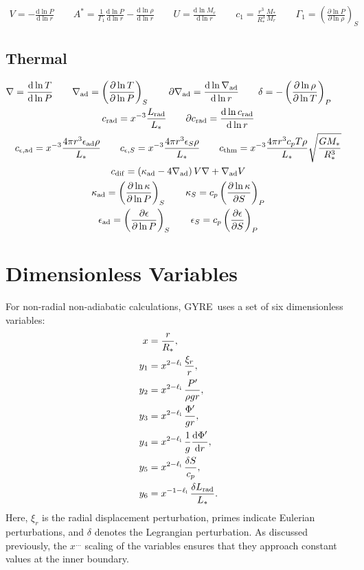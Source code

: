 \documentclass[fleqn]{article}
\newcommand{\gyre}{GYRE}
\newcommand{\diff}{\mathrm{d}}
\newcommand{\elli}{\ell_{\rm i}}
\newcommand{\As}{A^{\ast}}
\newcommand{\nabad}{\nabla_{\rm ad}}
\newcommand{\kapad}{\kappa_{\rm ad}}
\newcommand{\kapS}{\kappa_{S}}
\newcommand{\epsad}{\epsilon_{\rm ad}}
\newcommand{\epsS}{\epsilon_{S}}
\newcommand{\crad}{c_{\rm rad}}
\newcommand{\cepsad}{c_{\epsilon,{\rm ad}}}
\newcommand{\cepsS}{c_{\epsilon,S}}
\newcommand{\cthm}{c_{\rm thm}}
\newcommand{\cdif}{c_{\rm dif}}
\newcommand{\Rstar}{R_{\ast}}
\newcommand{\Mstar}{M_{\ast}}
\newcommand{\Lrad}{L_{\rm rad}}
\newcommand{\Lstar}{L_{\ast}}
\begin{document}
\begin{gather*}
V = -\frac{\diff \ln P}{\diff \ln r} \qquad
\As = \frac{1}{\Gamma_{1}} \frac{\diff \ln P}{\diff \ln r} - \frac{\diff \ln \rho}{\diff \ln r} \qquad
U = \frac{\diff \ln M_{r}}{\diff \ln r} \qquad
c_1 = \frac{r^{3}}{\Rstar^{3}} \frac{\Mstar}{M_{r}} \qquad
\Gamma_{1} = \left( \frac{\partial \ln P}{\partial \ln \rho} \right)_{S}
\end{gather*}

\subsection*{Thermal}

\begin{gather*}
\nabla = \frac{\diff \ln T}{\diff \ln P} \qquad
\nabad = \left( \frac{\partial \ln T}{\partial \ln P} \right)_{S} \qquad
\partial\nabad = \frac{\diff \ln \nabad}{\diff \ln r} \qquad
\delta = - \left( \frac{\partial \ln \rho}{\partial \ln T} \right)_{P} \qquad \\
\crad = x^{-3} \frac{\Lrad}{\Lstar} \qquad
\partial\crad = \frac{\diff \ln \crad}{\diff \ln r} \\
\cepsad = x^{-3} \frac{4\pi r^{3} \epsad \rho}{\Lstar} \qquad
\cepsS = x^{-3} \frac{4\pi r^{3} \epsS \rho}{\Lstar} \qquad
\cthm = x^{-3} \frac{4\pi r^{3} c_{p} T \rho}{\Lstar} \sqrt{\frac{G\Mstar}{\Rstar^{3}}} \\
\cdif = \left( \kapad - 4 \nabad \right) V \nabla + \nabad V \\
\kapad = \left( \frac{\partial \ln \kappa}{\partial \ln P} \right)_{S} \qquad
\kapS = c_{p} \left( \frac{\partial \ln \kappa}{\partial S} \right)_{P} \\
\epsad = \left( \frac{\partial \epsilon}{\partial \ln P} \right)_{S} \qquad
\epsS = c_{p} \left( \frac{\partial \epsilon}{\partial S} \right)_{P}
\end{gather*}


\section*{Dimensionless Variables}

For non-radial non-adiabatic calculations, \gyre\ uses a set of
six dimensionless variables:
\begin{align*}
x     &= \frac{r}{\Rstar}, \\
y_{1} &= x^{2-\elli}\, \frac{\xi_{r}}{r}, \\
y_{2} &= x^{2-\elli}\, \frac{P'}{\rho g r}, \\
y_{3} &= x^{2-\elli}\, \frac{\Phi'}{gr}, \\
y_{4} &= x^{2-\elli}\, \frac{1}{g} \frac{\diff \Phi'}{\diff r}, \\
y_{5} &= x^{2-\elli}\, \frac{\delta S}{c_{p}}, \\
y_{6} &= x^{-1-\elli}\, \frac{\delta \Lrad}{\Lstar}.
\end{align*}
Here, $\xi_{r}$ is the radial displacement perturbation, primes
indicate Eulerian perturbations, and $\delta$ denotes the Legrangian
perturbation. As discussed previously, the $x^{\ldots}$ scaling of
the variables ensures that they approach constant values at the
inner boundary.
\end{document}
